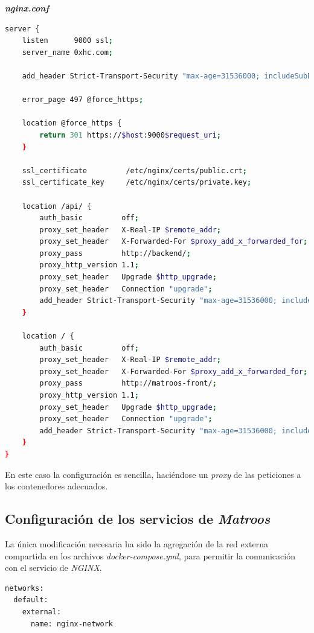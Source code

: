 \bigskip

\textbf{\textit{nginx.conf}}

\begin{lstlisting}[language=sh]
server {
    listen      9000 ssl;
    server_name 0xhc.com;

    add_header Strict-Transport-Security "max-age=31536000; includeSubDomains" always;

    error_page 497 @force_https;

    location @force_https {
        return 301 https://$host:9000$request_uri;
    }

    ssl_certificate         /etc/nginx/certs/public.crt;
    ssl_certificate_key     /etc/nginx/certs/private.key;

    location /api/ {
        auth_basic         off;
        proxy_set_header   X-Real-IP $remote_addr;
        proxy_set_header   X-Forwarded-For $proxy_add_x_forwarded_for;
        proxy_pass         http://backend/;
        proxy_http_version 1.1;
        proxy_set_header   Upgrade $http_upgrade;
        proxy_set_header   Connection "upgrade";
        add_header Strict-Transport-Security "max-age=31536000; includeSubDomains" always;
    }

    location / {
        auth_basic         off;
        proxy_set_header   X-Real-IP $remote_addr;
        proxy_set_header   X-Forwarded-For $proxy_add_x_forwarded_for;
        proxy_pass         http://matroos-front/;
        proxy_http_version 1.1;
        proxy_set_header   Upgrade $http_upgrade;
        proxy_set_header   Connection "upgrade";
        add_header Strict-Transport-Security "max-age=31536000; includeSubDomains" always;
    }
}
\end{lstlisting}

En este caso la configuración es sencilla, haciéndose un \textit{proxy} de las peticiones a los contenedores adecuados.


\subsection{Configuración de los servicios de \textit{Matroos}}

La única modificación necesaria ha sido la agregación de la red externa compartida en los archivos \textit{docker-compose.yml}, para permitir la comunicación con el servicio de \textit{NGINX}.

\begin{lstlisting}[language=sh]
networks:
  default:
    external:
      name: nginx-network
\end{lstlisting}


